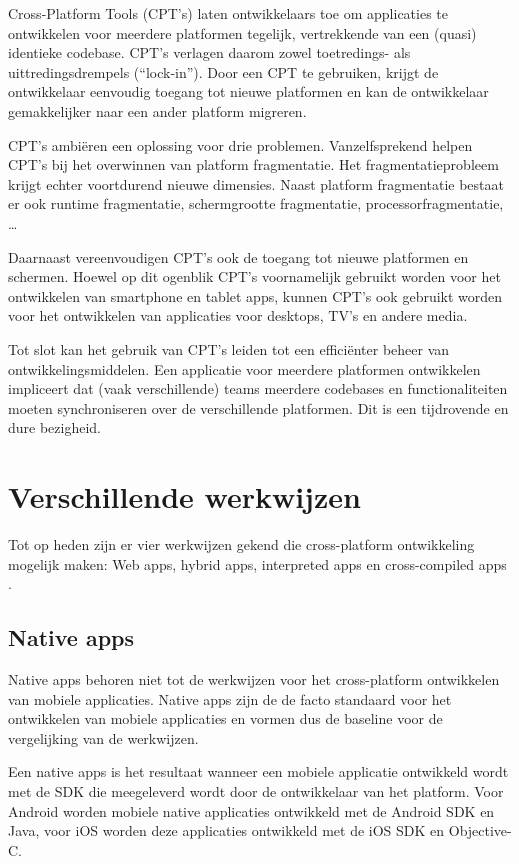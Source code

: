 \documentclass[a4paper]{IEEEconf}
\begin{document}
Cross-Platform Tools (CPT's) laten ontwikkelaars toe om applicaties te ontwikkelen voor meerdere platformen tegelijk, vertrekkende van een (quasi) identieke codebase. CPT's verlagen daarom zowel toetredings- als uittredingsdrempels (``lock-in''). Door een CPT te gebruiken, krijgt de ontwikkelaar eenvoudig toegang tot nieuwe platformen en kan de ontwikkelaar gemakkelijker naar een ander platform migreren. \cite{VM_CPT:2012}

CPT's ambiëren een oplossing voor drie problemen. Vanzelfsprekend helpen CPT's bij het overwinnen van platform fragmentatie. Het fragmentatieprobleem krijgt echter voortdurend nieuwe dimensies. Naast platform fragmentatie bestaat er ook runtime fragmentatie, schermgrootte fragmentatie, processorfragmentatie, \ldots 

Daarnaast vereenvoudigen CPT's ook de toegang tot nieuwe platformen en schermen. Hoewel op dit ogenblik CPT's voornamelijk gebruikt worden voor het ontwikkelen van smartphone en tablet apps, kunnen CPT's ook gebruikt worden voor het ontwikkelen van applicaties voor desktops, TV's en andere media.

Tot slot kan het gebruik van CPT's leiden tot een efficiënter beheer van ontwikkelingsmiddelen. Een applicatie voor meerdere platformen ontwikkelen impliceert dat (vaak verschillende) teams meerdere codebases en functionaliteiten moeten synchroniseren over de verschillende platformen. Dit is een tijdrovende en dure bezigheid.

\section{Verschillende werkwijzen}

Tot op heden zijn er vier werkwijzen gekend die cross-platform ontwikkeling mogelijk maken: Web apps, hybrid apps, interpreted apps en cross-compiled apps \cite{Friese:2012}.

\subsection{Native apps}

Native apps behoren niet tot de werkwijzen voor het cross-platform ontwikkelen van mobiele applicaties. Native apps zijn de de facto standaard voor het ontwikkelen van mobiele applicaties en vormen dus de baseline voor de vergelijking van de werkwijzen. 

Een native apps is het resultaat wanneer een mobiele applicatie ontwikkeld wordt met de SDK die meegeleverd wordt door de ontwikkelaar van het platform. Voor Android worden mobiele native applicaties ontwikkeld met de Android SDK en Java, voor iOS worden deze applicaties ontwikkeld met de iOS SDK en Objective-C.
\end{document}
